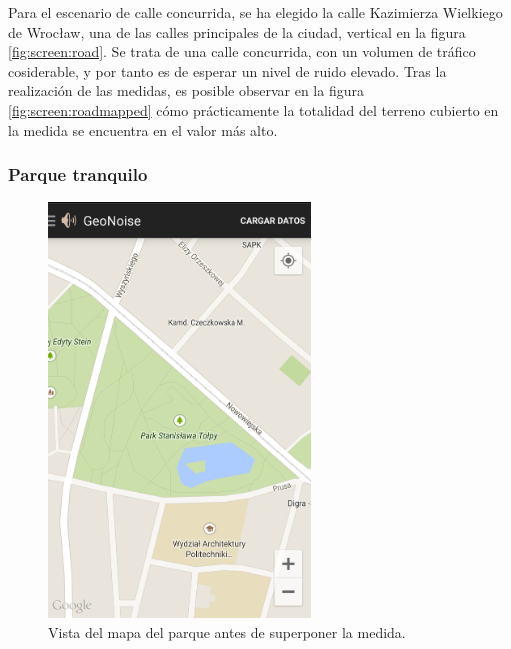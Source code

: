     Para el escenario de calle concurrida, se ha elegido la calle Kazimierza Wielkiego de Wrocław, una de las calles principales de la ciudad, vertical en la figura  \ref{fig:screen:road}. Se trata de una calle concurrida, con un volumen de tráfico cosiderable, y por tanto es de esperar un nivel de ruido elevado. Tras la realización de las medidas, es posible observar en la figura \ref{fig:screen:roadmapped} cómo prácticamente la totalidad del terreno cubierto en la medida se encuentra en el valor más alto.

\subsubsection{Parque tranquilo}
\begin{figure}[H] \centering
 \begin{minipage}{0.45\textwidth}\centering
    \includegraphics[height=11cm]{graphs/park.png} \caption{Vista del mapa del parque antes de superponer la medida.}\label{fig:screen:park}
 \end{minipage}
 \hfill
\begin{minipage}{0.45\textwidth}\centering

\end{minipage}
\end{figure}
